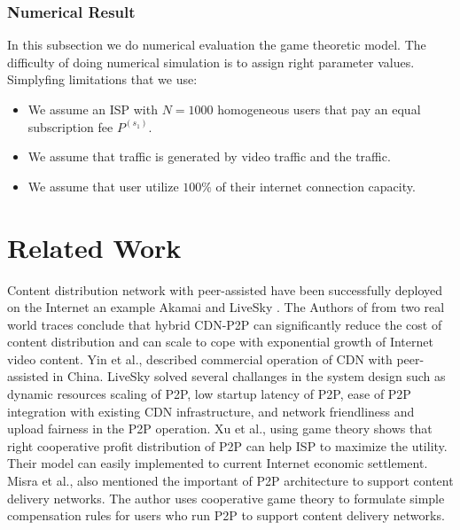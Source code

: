 \documentclass[paper]{ieice}
\begin{document}
\subsubsection{Numerical Result}
In this subsection we do numerical evaluation the game theoretic model. 
The difficulty of doing numerical simulation is to assign right parameter values.
Simplyfing limitations that we use: 
\begin{itemize}
	\item We assume an ISP with $N=1000$ homogeneous users that pay an equal subscription fee $P^{(s_1)}$.
	\item We assume that  traffic is generated by video traffic and the traffic.
	\item We assume that user utilize $100\%$ of their internet connection capacity.  
\end{itemize}


\section{Related Work} 
Content distribution network with peer-assisted have been successfully deployed on the Internet an example Akamai \cite{Huang:2008:UHC:1496046.1496064} and LiveSky \cite{Yin:2010:LEC:1823746.1823750}.
The Authors of \cite{Huang:2008:UHC:1496046.1496064} from two real world traces conclude that hybrid CDN-P2P can significantly reduce the cost of content distribution and can scale to cope with exponential growth of Internet video content.
Yin et al., \cite{Yin:2010:LEC:1823746.1823750} described commercial operation of CDN with peer-assisted in China.   
LiveSky solved several challanges in the system design such as dynamic resources scaling of P2P, low startup latency of P2P, ease of P2P integration with existing CDN infrastructure, and network friendliness and upload fairness in the P2P operation. 
Xu et al.,\cite{DBLP:journals/corr/abs-1212-4915} using game theory shows that right cooperative profit distribution of P2P can help ISP to maximize the utility. 
Their model can easily implemented to current Internet economic settlement.
Misra et al.,\cite{Misra:2010:IPS:1811099.1811064} also mentioned the important of P2P architecture to support content delivery networks. 
The author uses cooperative game theory to formulate simple compensation rules for users who run P2P to support content delivery networks.  
\end{document}
